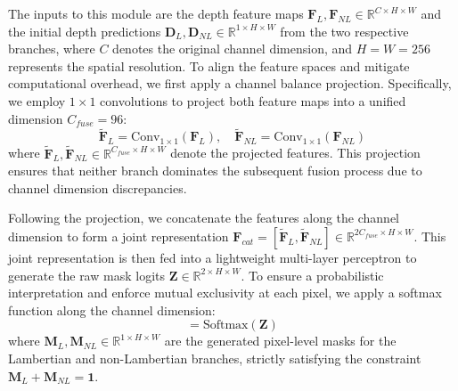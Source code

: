 \documentclass[lettersize,journal]{IEEEtran}
\begin{document}
The inputs to this module are the depth feature maps $\mathbf{F}_L, \mathbf{F}_{NL} \in \mathbb{R}^{C \times H \times W}$ and the initial depth predictions $\mathbf{D}_L, \mathbf{D}_{NL} \in \mathbb{R}^{1 \times H \times W}$ from the two respective branches, where $C$ denotes the original channel dimension, and $H=W=256$ represents the spatial resolution. To align the feature spaces and mitigate computational overhead, we first apply a channel balance projection. Specifically, we employ $1 \times 1$ convolutions to project both feature maps into a unified dimension $C_{fuse} = 96$:
\begin{equation}
\tilde{\mathbf{F}}_L = \text{Conv}_{1\times1}(\mathbf{F}_L), \quad \tilde{\mathbf{F}}_{NL} = \text{Conv}_{1\times1}(\mathbf{F}_{NL})
\label{eq:ch3_17}
\end{equation}
where $\tilde{\mathbf{F}}_L, \tilde{\mathbf{F}}_{NL} \in \mathbb{R}^{C_{fuse} \times H \times W}$ denote the projected features. This projection ensures that neither branch dominates the subsequent fusion process due to channel dimension discrepancies.

Following the projection, we concatenate the features along the channel dimension to form a joint representation $\mathbf{F}_{cat} = [\tilde{\mathbf{F}}_L, \tilde{\mathbf{F}}_{NL}] \in \mathbb{R}^{2C_{fuse} \times H \times W}$. This joint representation is then fed into a lightweight multi-layer perceptron to generate the raw mask logits $\mathbf{Z} \in \mathbb{R}^{2 \times H \times W}$. To ensure a probabilistic interpretation and enforce mutual exclusivity at each pixel, we apply a softmax function along the channel dimension:
\begin{equation}
[\mathbf{M}_L, \mathbf{M}_{NL}] = \text{Softmax}(\mathbf{Z})
\label{eq:ch3_18}
\end{equation}
where $\mathbf{M}_L, \mathbf{M}_{NL} \in \mathbb{R}^{1 \times H \times W}$ are the generated pixel-level masks for the Lambertian and non-Lambertian branches, strictly satisfying the constraint $\mathbf{M}_L + \mathbf{M}_{NL} = \mathbf{1}$.
\end{document}
